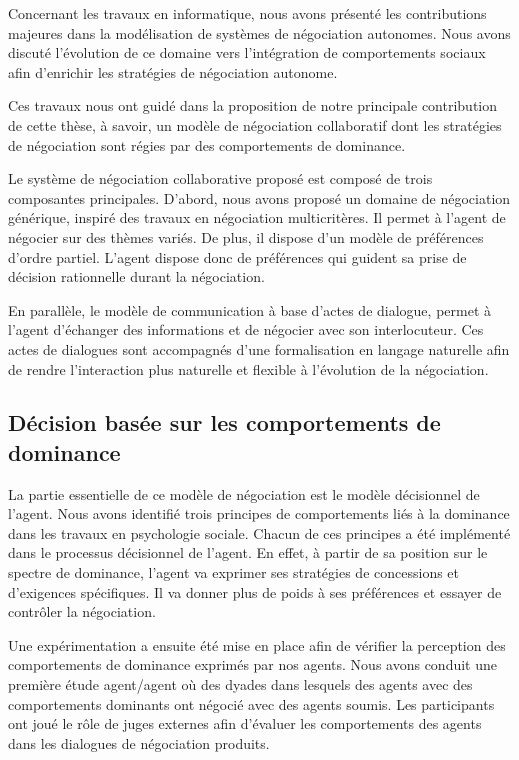 	Concernant les travaux en informatique, nous avons présenté les contributions majeures dans la modélisation de systèmes de négociation autonomes. Nous avons discuté l'évolution de ce domaine vers l'intégration de comportements sociaux afin d'enrichir les stratégies de négociation autonome. 
	
	
	Ces travaux nous ont guidé dans la proposition de notre principale contribution de cette thèse, à savoir, un modèle de négociation collaboratif dont les stratégies de négociation sont régies par des comportements de dominance.
	
	Le système de négociation collaborative proposé est composé de trois composantes principales.
	D'abord, nous avons proposé un domaine de négociation générique, inspiré des travaux en négociation multicritères. Il permet à l'agent de négocier sur des thèmes variés. De plus, il dispose d'un modèle de préférences d'ordre partiel. L'agent dispose donc de préférences qui guident sa prise de décision rationnelle durant la négociation.
	
	En parallèle, le modèle de communication à base d'actes de dialogue, permet à l'agent d'échanger des informations et de négocier avec son interlocuteur. Ces actes de dialogues sont accompagnés d'une formalisation en langage naturelle afin de rendre l'interaction plus naturelle et flexible à l'évolution de la négociation.
	
	\subsection{Décision basée sur les comportements de dominance}
	 
	 La partie essentielle de ce modèle de négociation est le modèle décisionnel de l'agent. Nous avons identifié trois principes de comportements liés à la dominance dans les travaux  en psychologie sociale. Chacun de ces principes a été implémenté dans le processus décisionnel de l'agent.
	 En effet, à partir de sa position sur le spectre de dominance, l'agent va exprimer ses stratégies de concessions et d'exigences spécifiques. Il va donner plus de poids à ses préférences et essayer de contrôler la négociation. 
	
	Une expérimentation a ensuite été mise en place afin de vérifier la perception des comportements de dominance exprimés par nos agents.
	Nous avons conduit une première étude agent/agent où des dyades dans lesquels des agents avec des comportements dominants ont négocié avec des agents soumis. Les participants ont joué le rôle de juges externes afin d'évaluer les comportements des agents dans les dialogues de négociation produits. 

